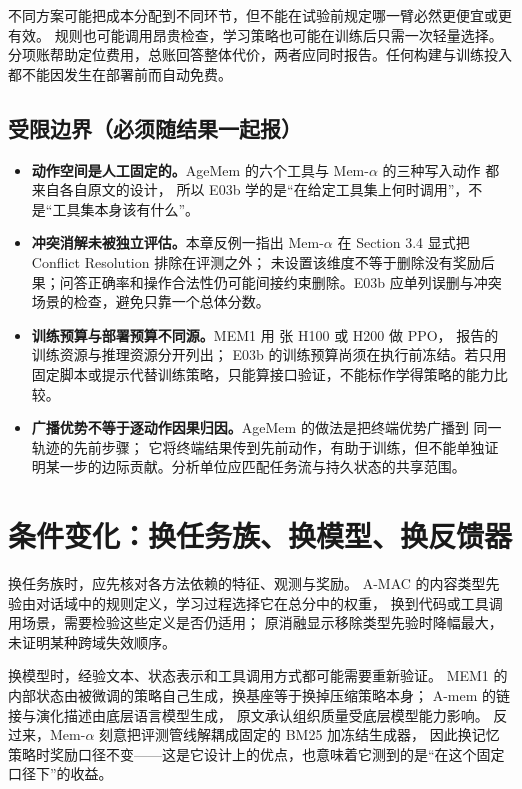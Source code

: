 不同方案可能把成本分配到不同环节，但不能在试验前规定哪一臂必然更便宜或更有效。
规则也可能调用昂贵检查，学习策略也可能在训练后只需一次轻量选择。
分项账帮助定位费用，总账回答整体代价，两者应同时报告。任何构建与训练投入都不能因发生在部署前而自动免费。

\subsection*{受限边界（必须随结果一起报）}

\begin{itemize}
  \item \textbf{动作空间是人工固定的。}AgeMem 的六个工具与 Mem-$\alpha$ 的三种写入动作
        都来自各自原文的设计\cite{agemem-2601,memalpha-2509}，
        所以 E03b 学的是“在给定工具集上何时调用”，不是“工具集本身该有什么”。
  \item \textbf{冲突消解未被独立评估。}本章反例一指出 Mem-$\alpha$ 在 Section 3.4 显式把
        Conflict Resolution 排除在评测之外\cite{memalpha-2509}；
        未设置该维度不等于删除没有奖励后果；问答正确率和操作合法性仍可能间接约束删除。E03b 应单列误删与冲突场景的检查，避免只靠一个总体分数。
  \item \textbf{训练预算与部署预算不同源。}MEM1 用  张 H100 或 H200 做 PPO，
        报告的训练资源与推理资源分开列出\cite{mem1-2506}；
        E03b 的训练预算尚须在执行前冻结。若只用固定脚本或提示代替训练策略，只能算接口验证，不能标作学得策略的能力比较。
  \item \textbf{广播优势不等于逐动作因果归因。}AgeMem 的做法是把终端优势广播到
        同一轨迹的先前步骤\cite{agemem-2601}；
        它将终端结果传到先前动作，有助于训练，但不能单独证明某一步的边际贡献。分析单位应匹配任务流与持久状态的共享范围。
\end{itemize}

\section{条件变化：换任务族、换模型、换反馈器}
\label{sec:ch06-conditions}

换任务族时，应先核对各方法依赖的特征、观测与奖励。
A-MAC 的内容类型先验由对话域中的规则定义，学习过程选择它在总分中的权重，
换到代码或工具调用场景，需要检验这些定义是否仍适用；
原消融显示移除类型先验时降幅最大，未证明某种跨域失效顺序\cite{amac-2603}。

换模型时，经验文本、状态表示和工具调用方式都可能需要重新验证。
MEM1 的内部状态由被微调的策略自己生成，换基座等于换掉压缩策略本身；
A-mem 的链接与演化描述由底层语言模型生成，
原文承认组织质量受底层模型能力影响\cite{amem-2502}。
反过来，Mem-$\alpha$ 刻意把评测管线解耦成固定的 BM25 加冻结生成器，
因此换记忆策略时奖励口径不变——这是它设计上的优点，也意味着它测到的是“在这个固定口径下”的收益。

